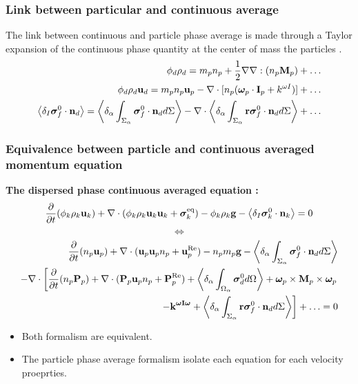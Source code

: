 \documentclass{sintefbeamer}
\begin{document}
\begin{frame}
  \frametitle{Link between particular and continuous average}

  The link between continuous and particle phase average is made through a Taylor expansion of the continuous phase quantity at the center of mass the particles \citep{zhang1994ensemble}. 
  \begin{align*}
    \phi_d \rho_d
    = m_p n_p 
    + \frac{1}{2}\mathbf{\nabla}\mathbf{\nabla} : (n_p\textbf{M}_p)+\ldots\\
    \phi_d \rho_d \textbf{u}_d
    = m_p n_p \textbf{u}_p 
    - \mathbf{\nabla}\cdot [n_p(\bm\omega_p \cdot \textbf{I}_p + k^{\omega I})]+\ldots\\
    \left<\delta_I \bm{\sigma}_f^0 \cdot \textbf{n}_d\right>
    = 
    \left<\delta_\alpha \int_{\Sigma_\alpha} \bm{\sigma}_f^0 \cdot \textbf{n}_d d\Sigma\right>
    - \mathbf{\nabla}\cdot \left<\delta_\alpha \int_{\Sigma_\alpha} \textbf{r}\bm{\sigma}_f^0 \cdot \textbf{n}_d d\Sigma\right>
    + \ldots
\end{align*}

\end{frame}


\begin{frame}
  \frametitle{Equivalence between particle and continuous averaged momentum equation}
  \textbf{The dispersed phase continuous averaged equation :}
  \begin{align*}
    \frac{\partial}{\partial t} (\phi_k \rho_k\textbf{u}_k)  
    + \mathbf{\nabla}\cdot (
        \phi_k \rho_k\textbf{u}_k\textbf{u}_k
        + \bm{\sigma}_k^\text{eq}
    )
    - 
    \phi_k  \rho_k \textbf{g}
    -  \left<\delta_I \bm{\sigma}_k^0 \cdot \textbf{n}_k\right>
    = 0
  \end{align*}
  \begin{equation*}
    \Longleftrightarrow 
  \end{equation*}
  \small
  \begin{align*}
    \frac{\partial}{\partial t} (n_p\textbf{u}_p) + \mathbf{\nabla}\cdot (\textbf{u}_p\textbf{u}_p n_p+ \textbf{u}^\text{Re}_p)
    - 
    n_pm_p\textbf{g}
    - \left<\delta_\alpha \int_{\Sigma_\alpha} \bm{\sigma}_f^0 \cdot \textbf{n}_d d\Sigma\right>  \\
    - \mathbf{\nabla}\cdot\left[
      \frac{\partial}{\partial t} (n_p\textbf{P}_p) + \mathbf{\nabla}\cdot (\textbf{P}_p\textbf{u}_p n_p+ \textbf{P}^\text{Re}_p)
        + \left<\delta_\alpha \int_{\Omega_\alpha} \bm{\sigma}_d^0  d\Omega\right>
        + \bm\omega_p \times \textbf{M}_p\times \bm\omega_p 
        \right.\\ \left.
        - \textbf{k}^{\bm\omega \textbf{I} \bm\omega}
        + \left<\delta_\alpha \int_{\Sigma_\alpha}  \textbf{r}\bm{\sigma}_f^0\cdot \textbf{n}_d d\Sigma\right>
    \right]
    +\ldots = 0 
  \end{align*}
\begin{itemize}
  \item Both formalism are equivalent. 
  \item The particle phase average formalism isolate each equation for each velocity proeprties.
\end{itemize}
\end{frame}
\end{document}
